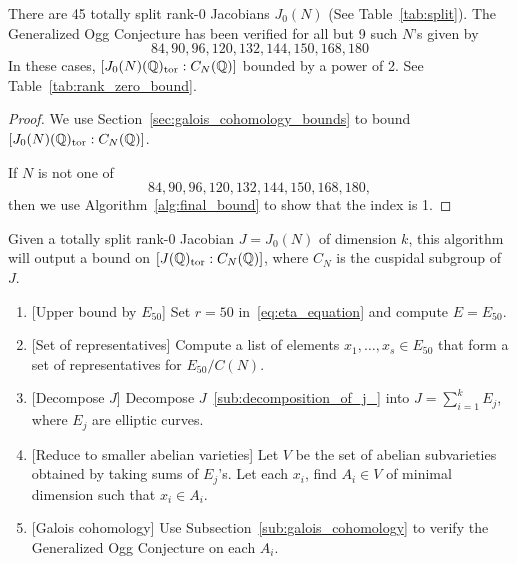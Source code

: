 

\begin{theorem}%
    \label{thm:verification_rank_zero}
    There are 45 totally split rank-0 Jacobians $J_0(N)$ (See
    Table~\ref{tab:split}). The Generalized Ogg Conjecture has been verified
    for all but 9 such $N$'s given by
    \[
        84,90,96,120,132,144,150,168,180
    \]
    In these cases, $[J_0(N)(\mathbb{Q})_{\mathrm{tor}}:C_N(\mathbb{Q})]$ bounded by a power of 2. See
    Table~\ref{tab:rank_zero_bound}.
\end{theorem}
\begin{proof}
    We use Section~\ref{sec:galois_cohomology_bounds} to bound
    $[J_0(N)(\mathbb{Q})_{\mathrm{tor}}:C_N(\mathbb{Q})]$.

    If $N$ is not one of 
    \[
        84,90,96,120,132,144,150,168,180,
    \]
    then we use Algorithm~\ref{alg:final_bound} to show that the index is 1.
\end{proof}
\begin{algorithm}{}%
    \label{alg:final_bound}
    Given a totally split rank-0 Jacobian $J=J_0(N)$ of dimension $k$, this
    algorithm will output a bound on $[J(\mathbb{Q})_{\mathrm{tor}}:C_N(\mathbb{Q})]$, where $C_N$ is
    the cuspidal subgroup of $J$.
    \begin{enumerate}
        \item{} [Upper bound by $E_{50}$]
            Set $r=50$ in~\eqref{eq:eta_equation} and compute $E=E_{50}$.
        \item{} [Set of representatives]
            Compute a list of elements $x_1,\ldots,x_s\in E_{50}$ that form a
            set of representatives for $E_{50}/C(N)$.
        \item{} [Decompose $J$]
            Decompose $J$~\ref{sub:decomposition_of_j_} into $J=\sum_{i=1} ^k
            E_j$, where $E_j$ are elliptic curves. 
        \item{} [Reduce to smaller abelian varieties]
            Let $V$ be the set of abelian subvarieties obtained by taking sums
            of $E_j$'s. Let each $x_i$, find $A_i\in V$ of minimal dimension
            such that $x_i\in A_i$.
        \item{} [Galois cohomology]
            Use Subsection~\ref{sub:galois_cohomology} to verify the
            Generalized Ogg Conjecture on each $A_i$.
    \end{enumerate}
\end{algorithm}

